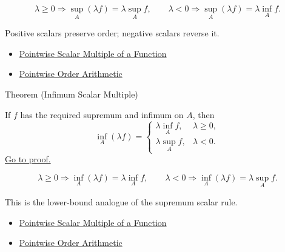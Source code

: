 \begin{remark*}
\[
  \lambda\geq0\Rightarrow \sup_A(\lambda f)=\lambda\sup_A f,
  \qquad
  \lambda<0\Rightarrow \sup_A(\lambda f)=\lambda\inf_A f.
\]
\end{remark*}

\begin{remark*}[Interpretation]
Positive scalars preserve order; negative scalars reverse it.
\end{remark*}

\begin{dependencies}
\begin{itemize}
  \item \hyperref[def:pointwise-scalar-multiple-of-a-function]{Pointwise Scalar Multiple of a Function}
  \item \hyperref[thm:pointwise-order-arithmetic]{Pointwise Order Arithmetic}
\end{itemize}
\end{dependencies}

\begin{theorembox}{Theorem (Infimum Scalar Multiple)}
\begin{theorem}
\label{thm:infimum-scalar-multiple}
If \(f\) has the required supremum and infimum on \(A\), then
\[
  \inf_A(\lambda f)=
  \begin{cases}
    \lambda\inf_A f,& \lambda\geq0,\\
    \lambda\sup_A f,& \lambda<0.
  \end{cases}
\]
\hyperref[prf:infimum-scalar-multiple]{Go to proof.}
\end{theorem}
\end{theorembox}

\begin{remark*}
\[
  \lambda\geq0\Rightarrow \inf_A(\lambda f)=\lambda\inf_A f,
  \qquad
  \lambda<0\Rightarrow \inf_A(\lambda f)=\lambda\sup_A f.
\]
\end{remark*}

\begin{remark*}[Interpretation]
This is the lower-bound analogue of the supremum scalar rule.
\end{remark*}

\begin{dependencies}
\begin{itemize}
  \item \hyperref[def:pointwise-scalar-multiple-of-a-function]{Pointwise Scalar Multiple of a Function}
  \item \hyperref[thm:pointwise-order-arithmetic]{Pointwise Order Arithmetic}
\end{itemize}
\end{dependencies}

